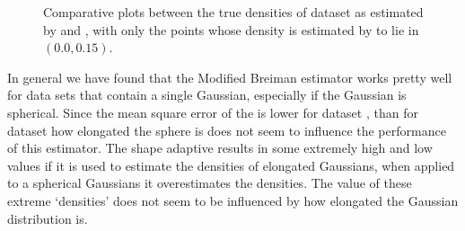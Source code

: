 \begin{figure}
\begin{subfigure}{0.6\columnwidth}
			\caption{\sambe}
			\label{fig:results:baakman5:noOUtliers:sambe}
		\end{subfigure}	
		\caption{Comparative plots between the true densities of dataset \baakmanFive as estimated by  \mbe and  \sambe, with only the points whose density is estimated by \sambe to lie in $\left(\num{0.0}, \num{0.15} \right)$.}
		\label{fig:results:baakman5:noOutliers}
	\end{figure}

	In general we have found that the Modified Breiman estimator works pretty well for data sets that contain a single Gaussian, especially if the Gaussian is spherical. Since the mean square error of the \mbe is lower for dataset \baakmanFive, than for dataset \baakmanFour how elongated the sphere is does not seem to influence the performance of this estimator. 
	The shape adaptive \mbe results in some extremely high and low values if it is used to estimate the densities of elongated Gaussians, when applied to a spherical Gaussians it overestimates the densities. The value of these extreme `densities' does not seem to be influenced by how elongated the Gaussian distribution is. 
